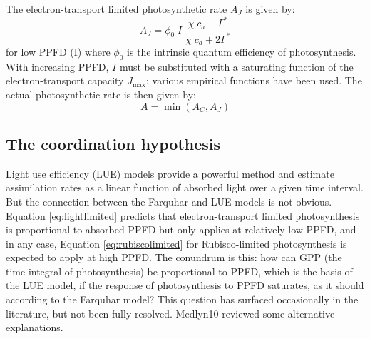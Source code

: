 \documentclass{myreport}
\begin{document}
The electron-transport limited photosynthetic rate $A_J$ is given by:
\begin{equation}
\label{eq:lightlimited}
    A_J = \phi_0 \; I\; \frac{\chi \; c_a - \Gamma^{\ast}}{\chi\;c_a + 2\Gamma^{\ast}}
\end{equation}
for low PPFD (I) where $\phi_0$ is the intrinsic quantum efficiency of photosynthesis. 
With increasing PPFD, $I$ must be substituted with a saturating function of the electron-transport capacity $J_{\mathrm{max}}$; various empirical functions have been used. 
The actual photosynthetic rate is then given by:
\begin{equation}
    A = \min(A_C, A_J)
\end{equation}

\subsection{The coordination hypothesis}
\label{sec:coordination}
Light use efficiency (LUE) models provide a powerful method and estimate assimilation rates as a linear function of absorbed light over a given time interval. 
But the connection between the Farquhar and LUE models is not obvious. 
Equation \ref{eq:lightlimited} predicts that electron-transport limited photosynthesis is proportional to absorbed PPFD but only applies at relatively low PPFD, and in any case, Equation \ref{eq:rubiscolimited} for Rubisco-limited photosynthesis is expected to apply at high PPFD. 
The conundrum is this: how can GPP (the time-integral of photosynthesis) be proportional to PPFD, which is the basis of the LUE model, if the response of photosynthesis to PPFD saturates, as it should according to the Farquhar model? This question has surfaced occasionally in the literature, but not been fully resolved. 
Medlyn10 reviewed some alternative explanations.
 
\end{document}
